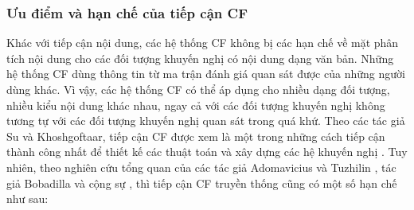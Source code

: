 
\subsubsection{Ưu điểm và hạn chế của tiếp cận CF}
Khác với tiếp cận nội dung, các hệ thống CF không bị các hạn chế về mặt phân tích nội dung cho các đối tượng khuyến nghị có nội dung dạng văn bản. Những hệ thống CF dùng thông tin từ ma trận đánh giá quan sát được của những người dùng khác. Vì vậy, các hệ thống CF có thể áp dụng cho nhiều dạng đối tượng, nhiều kiểu nội dung khác nhau, ngay cả với các đối tượng khuyến nghị không tương tự với các đối tượng khuyến nghị quan sát trong quá khứ. Theo các tác giả Su và Khoshgoftaar, tiếp cận CF được xem là một trong những cách tiếp cận thành công nhất để thiết kế các thuật toán và xây dựng các hệ khuyến nghị \cite{Su:2009:SCF}. Tuy nhiên, theo nghiên cứu tổng quan của các tác giả Adomavicius và Tuzhilin \cite{Adomavicius:2005:TNG:1070611.1070751}, tác giả Bobadilla và cộng sự \cite{Bobadilla2013109}, thì tiếp cận CF truyền thống cũng có một số hạn chế như sau: 
